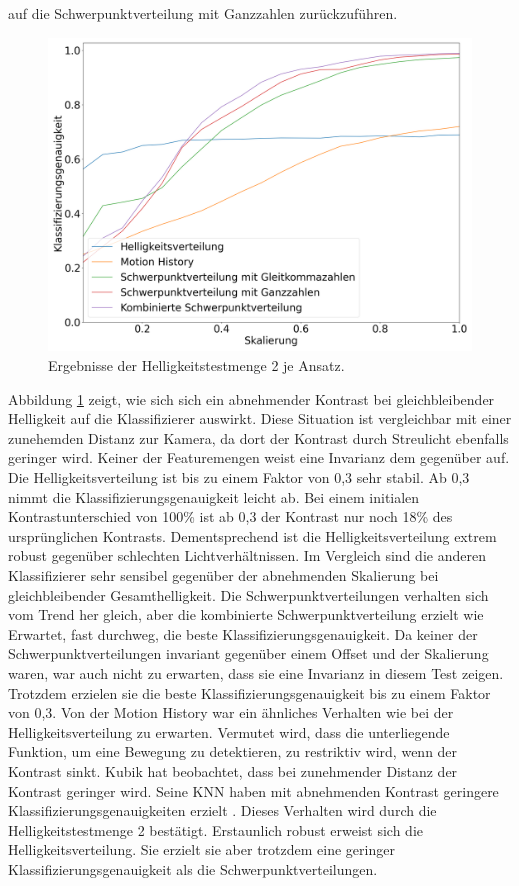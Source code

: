 auf die Schwerpunktverteilung mit Ganzzahlen zurückzuführen.
\begin{figure}[h!]
    \centering
    \includegraphics[width=\linewidth]{images/brightness2_scaling.png}
    \caption{Ergebnisse der Helligkeitstestmenge 2 je Ansatz.}
    \label{fig:brightness2_scaling}
\end{figure}
\newline
\newline
Abbildung \ref{fig:brightness2_scaling} zeigt, wie sich sich ein abnehmender Kontrast bei gleichbleibender Helligkeit auf die Klassifizierer auswirkt. Diese Situation ist vergleichbar mit einer zunehemden Distanz
zur Kamera, da dort der Kontrast durch Streulicht ebenfalls geringer wird. Keiner der Featuremengen weist eine Invarianz dem gegenüber auf. Die Helligkeitsverteilung ist bis zu einem Faktor von 0,3 sehr stabil. Ab 0,3
nimmt die Klassifizierungsgenauigkeit leicht ab. Bei einem initialen Kontrastunterschied von 100\% ist ab 0,3 der Kontrast nur noch 18\% des ursprünglichen Kontrasts. Dementsprechend ist die Helligkeitsverteilung extrem
robust gegenüber schlechten Lichtverhältnissen. Im Vergleich sind die anderen Klassifizierer sehr sensibel gegenüber der abnehmenden Skalierung bei gleichbleibender Gesamthelligkeit.
Die Schwerpunktverteilungen verhalten sich vom Trend her gleich, aber die
kombinierte Schwerpunktverteilung erzielt wie Erwartet, fast durchweg, die beste Klassifizierungsgenauigkeit. Da keiner der Schwerpunktverteilungen invariant gegenüber einem Offset und der Skalierung waren, war auch
nicht zu erwarten, dass sie eine Invarianz in diesem Test zeigen. Trotzdem erzielen sie die beste Klassifizierungsgenauigkeit bis zu einem Faktor von 0,3. Von der Motion History war ein ähnliches Verhalten wie bei der
Helligkeitsverteilung zu erwarten. Vermutet wird, dass die unterliegende Funktion, um eine Bewegung zu detektieren, zu restriktiv wird, wenn der Kontrast sinkt.
\newline
\newline
Kubik hat beobachtet, dass bei zunehmender Distanz der Kontrast geringer wird. Seine KNN haben mit abnehmenden Kontrast geringere Klassifizierungsgenauigkeiten erzielt \cite{kubikThesis}. Dieses Verhalten wird durch die
Helligkeitstestmenge 2 bestätigt. Erstaunlich robust erweist sich die Helligkeitsverteilung. Sie erzielt sie aber trotzdem eine geringer Klassifizierungsgenauigkeit als die Schwerpunktverteilungen.
